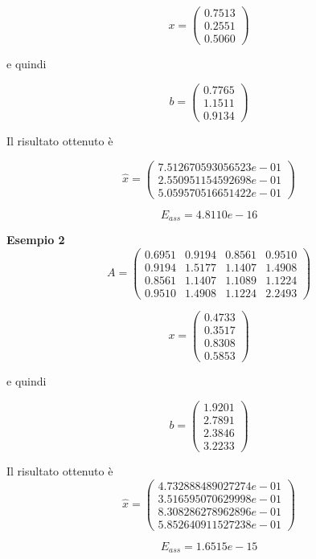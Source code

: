 \[
x = \begin{pmatrix}
0.7513\\
0.2551\\
0.5060
\end{pmatrix}
\]

e quindi

\[
b = \begin{pmatrix}
0.7765\\
1.1511\\
0.9134
\end{pmatrix}
\]

Il risultato ottenuto è

\[
\hat{x} = \begin{pmatrix}
7.512670593056523e-01\\
2.550951154592698e-01\\
5.059570516651422e-01
\end{pmatrix}
\]

\[
E_{ass} = 4.8110e-16
\]

\textbf{Esempio 2}
\[
A = \begin{pmatrix}
0.6951 & 0.9194 & 0.8561 & 0.9510\\
0.9194 & 1.5177 & 1.1407 & 1.4908\\
0.8561 & 1.1407 & 1.1089 & 1.1224\\
0.9510 & 1.4908 & 1.1224 & 2.2493
\end{pmatrix}
\]

\[
x = \begin{pmatrix}
0.4733\\
0.3517\\
0.8308\\
0.5853
\end{pmatrix}
\]

e quindi

\[
b = \begin{pmatrix}
1.9201\\
2.7891\\
2.3846\\
3.2233
\end{pmatrix}
\]

Il risultato ottenuto è
\[
\hat{x} = \begin{pmatrix}
4.732888489027274e-01\\
3.516595070629998e-01\\
8.308286278962896e-01\\
5.852640911527238e-01

\end{pmatrix}
\]

\[
E_{ass} = 1.6515e-15
\]
